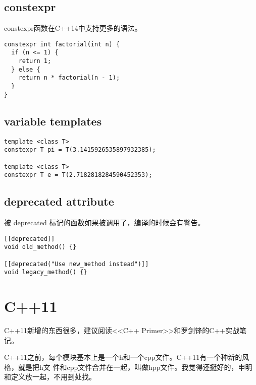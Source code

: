 \subsection{constexpr}

constexpr函数在C++14中支持更多的语法。

\begin{verbatim}
constexpr int factorial(int n) {
  if (n <= 1) {
    return 1;
  } else {
    return n * factorial(n - 1);
  }
}
\end{verbatim}

\subsection{variable templates}

\begin{verbatim}
template <class T>
constexpr T pi = T(3.1415926535897932385);

template <class T>
constexpr T e = T(2.7182818284590452353);
\end{verbatim}

\subsection{deprecated attribute}

被 deprecated 标记的函数如果被调用了，编译的时候会有警告。

\begin{verbatim}
[[deprecated]]
void old_method() {}

[[deprecated("Use new_method instead")]]
void legacy_method() {}
\end{verbatim}

\section{C++11}

C++11新增的东西很多，建议阅读<<C++ Primer>>和罗剑锋的C++实战笔记。

C++11之前，每个模块基本上是一个h和一个cpp文件。C++11有一个种新的风格，就是把h文
件和cpp文件合并在一起，叫做hpp文件。我觉得还挺好的，申明和定义放一起，不用到处找。

